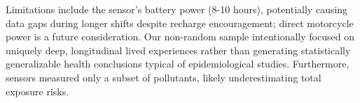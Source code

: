 

Limitations include the sensor's battery power (8-10 hours), potentially causing data gaps during longer shifts despite recharge encouragement; direct motorcycle power is a future consideration.
Our non-random sample intentionally focused on uniquely deep, longitudinal lived experiences rather than generating statistically generalizable health conclusions typical of epidemiological studies.
Furthermore, sensors measured only a subset of pollutants, likely underestimating total exposure risks.